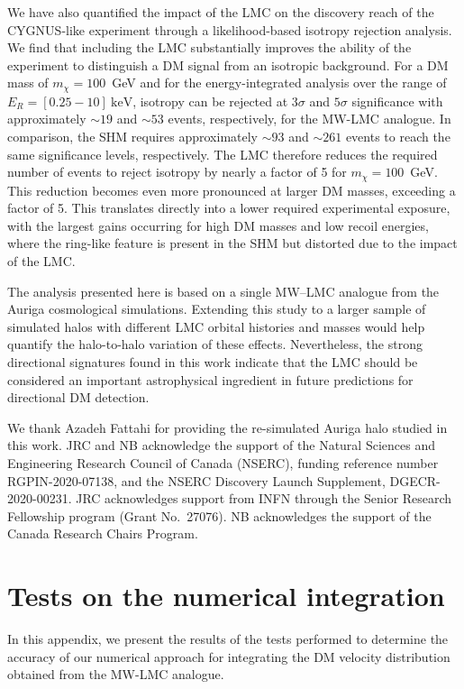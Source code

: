 \documentclass[a4paper,11pt]{article}
\begin{document}
We have also quantified the impact of the LMC on the discovery reach of the CYGNUS-like experiment through a likelihood-based isotropy rejection analysis. We find that including the LMC substantially improves the ability of the experiment to distinguish a DM signal from an isotropic background. For a DM mass of $m_\chi=100$~GeV and for the energy-integrated analysis over the range of $E_R =[0.25-10]~\mathrm{keV}$, isotropy can be rejected at $3\sigma$ and $5\sigma$ significance with approximately $\sim 19$ and $\sim 53$ events, respectively, for the MW-LMC analogue. In comparison, the SHM requires approximately $\sim 93$ and $\sim 261$ events to reach the same significance levels, respectively. The LMC therefore reduces the required number of events to reject isotropy by nearly a factor of 5 for $m_\chi=100$~GeV. This reduction becomes even more pronounced at larger DM masses, exceeding a factor of 5. 
This translates directly into a lower required experimental exposure, with the largest gains occurring for high DM masses and low recoil energies, where the ring-like feature is present in the SHM but distorted due to the impact of the LMC. 

The analysis presented here is based on a single MW--LMC analogue from the Auriga cosmological simulations. Extending this study to a larger sample of simulated halos with different LMC orbital histories and masses would help quantify the halo-to-halo variation of these effects. Nevertheless, the strong directional signatures found in this work indicate that the LMC should be considered an important astrophysical ingredient in future predictions for directional DM detection.    



\acknowledgments We thank Azadeh Fattahi for providing the re-simulated Auriga halo studied in this work. JRC and NB acknowledge the support of the Natural Sciences and Engineering Research Council of Canada (NSERC), funding reference number RGPIN-2020-07138, and the NSERC Discovery Launch Supplement, DGECR-2020-00231. JRC acknowledges support from INFN through the Senior Research Fellowship 
program (Grant No.~27076). NB acknowledges the support of the Canada Research Chairs Program. 


\appendix
\section{Tests on the numerical integration}
\label{sec:appendix_numerical_int}

In this appendix, we present the results of the tests performed to determine the accuracy of our numerical approach for integrating the DM velocity distribution obtained from the MW-LMC analogue.
\end{document}

